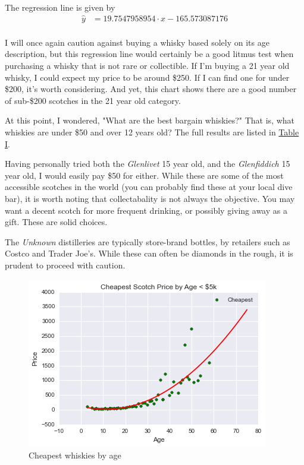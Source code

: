 The regression line is given by
\begin{equation*}
\begin{split}
    \hat{y} &= 19.7547958954 \cdot x  -165.573087176\\
\end{split}
\end{equation*}

I will once again caution against buying a whisky based solely on its age description, but this regression line would certainly be a good litmus test when purchasing a whisky that is not rare or collectible. If I'm buying a 21 year old whisky, I could expect my price to be around \$250. If I can find one for under \$200, it's worth considering. And yet, this chart shows there are a good number of sub-\$200 scotches in the 21 year old category. 


At this point, I wondered, "What are the best bargain whiskies?" That is, what whiskies are under \$50 and over 12 years old? The full results are listed in
\hyperref[sec:Bargains]{Table I}.


Having personally tried both the \textit{Glenlivet} 15 year old, and the \textit{Glenfiddich} 15 year old, I would easily pay \$50 for either. While these are some of the most accessible scotches in the world (you can probably find these at your local dive bar), it is worth noting that collectabality is not always the objective. You may want a decent scotch for more frequent drinking, or possibly giving away as a gift. These are solid choices.

The \textit{Unknown} distilleries are typically store-brand bottles, by retailers such as Costco and Trader Joe's. While these can often be diamonds in the rough, it is prudent to proceed with caution. 

\begin{figure}[htb]
\centering
\includegraphics[scale=1]{cheapest_price_by_age} 
\caption{Cheapest whiskies by age}
\label{fig:cheapest} 
\end{figure}


